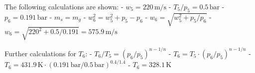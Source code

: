 The following calculations are shown:  
- \( w_5 = 220 \, \text{m/s} \)  
- \( T_5/p_5 = 0.5 \, \text{bar} \)  
- \( p_6 = 0.191 \, \text{bar} \)  
- \( m_s = m_g \)  
- \( w_6^2 = w_5^2 + p_5 - p_6 \)  
- \( w_6 = \sqrt{w_5^2 + p_5/p_6} \)  
- \( w_6 = \sqrt{220^2 + 0.5/0.191} = 575.9 \, \text{m/s} \)  

Further calculations for \( T_6 \):  
- \( T_6/T_5 = (p_6/p_5)^{n-1/n} \)  
- \( T_6 = T_5 \cdot (p_6/p_5)^{n-1/n} \)  
- \( T_6 = 431.9 \, \text{K} \cdot (0.191 \, \text{bar}/0.5 \, \text{bar})^{0.4/1.4} \)  
- \( T_6 = 328.1 \, \text{K} \)